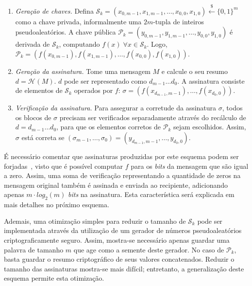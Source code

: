 \documentclass[12pt,notitlepage]{report}
\newcommand{\pk}{\mathcal{P}_k}
\newcommand{\sk}{\mathcal{S}_k}
\newcommand{\hash}[2][]{\mathcal{H}^{#1}(#2)}
\newcommand{\binwds}[1]{\{0, 1\}^{#1}}
\begin{document}
\begin{enumerate}

  \item[] \emph{Geração de chaves.} Defina $\sk{} = (x_{0, m-1}, x_{1, m-1},
      \dots, x_{0,0}, x_{1,0}) \stackrel{\$}{\longleftarrow} \binwds{m}$ como a
        chave privada, informalmente uma $2m$-tupla de inteiros
        pseudoaleatórios. A chave pública $\pk{} = (y_{0, m-1}, y_{1, m-1},
        \dots, y_{0,0}, y_{1,0})$ é derivada de $\sk{}$, computando $f(x) \;
        \forall x \in  \sk{}$. Logo, $\pk{} = (f(x_{0, m-1}), f(x_{1, m-1}),
        \dots, f(x_{0,0}), f(x_{1,0}))$.

  \item[] \emph{Geração da assinatura.} Tome uma mensagem $M$ e calcule o seu
      resumo $d = \hash{M}$. $d$ pode ser representado como $d_{m-1} \dots
        d_0$. A assinatura consiste de elementos de $\sk{}$ operados por $f$:
        $\sigma = (f(x_{d_{m-1}, m-1}), \dots, f(x_{d_0, 0}))$.

  \item[] \emph{Verificação da assinatura.} Para assegurar a corretude da
      assinatura $\sigma$, todos os blocos de $\sigma$ precisam ser verificados
        separadamente através do recálculo de $d = d_{m-1} \dots d_0$, para que
        os elementos corretos de $\pk{}$ sejam escolhidos.  Assim, $\sigma$
        está correta se $(\sigma_{m-1}, \dots, \sigma_0) = (y_{d_{m-1}, m-1},
        \dots, y_{d_{0}, 0})$.

\end{enumerate}

É necessário comentar que assinaturas produzidas por este esquema podem ser
forjadas~\cite{Merkle:1989:CDS:118209.118230}, visto que é possível computar
$f$ para os \emph{bits} da mensagem que são igual a zero. Assim, uma soma de
verificação representando a quantidade de zeros na mensagem original também é
assinada e enviada ao recipiente, adicionando apenas $m \cdot log_2(m)$
\emph{bits} na assinatura. Esta característica será explicada em mais detalhes
no próximo esquema.

Ademais, uma otimização simples para reduzir o tamanho de $\sk{}$ pode
ser implementada através da utilização de um gerador de números
pseudoaleatórios criptograficamente seguro. Assim, mostra-se necessário apenas
guardar uma palavra de tamanho $m$ que age como a semente deste gerador. No
caso de $\pk{}$, basta guardar o resumo criptográfico de seus valores
concatenados. Reduzir o tamanho das assinaturas mostra-se mais difícil;
entretanto, a generalização deste esquema permite esta otimização.
\end{document}

